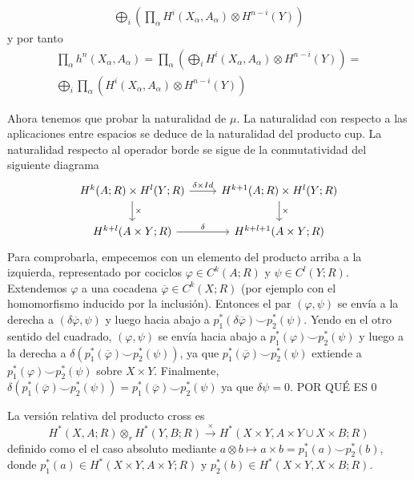 \documentclass[TA.tex]{subfiles}
\begin{document}
\begin{dem}
\begin{enumerate}
\begin{gather*}
\bigoplus_i\left( \prod_\alpha H^i(X_\alpha,A_\alpha)\otimes H^{n-i}(Y)\right)
\end{gather*}
y por tanto
\begin{gather*}
\prod_\alpha h^n(X_\alpha,A_\alpha)=\prod_\alpha\left(\bigoplus_i H^i(X_\alpha,A_\alpha)\otimes H^{n-i}(Y)\right)=\\
\bigoplus_i\prod_\alpha\left(H^i(X_\alpha,A_\alpha)\otimes H^{n-i}(Y)\right)
\end{gather*}
\end{enumerate}
Ahora tenemos que probar la naturalidad de $\mu$. La naturalidad con respecto a las aplicaciones entre espacios se deduce de la naturalidad del producto cup. La naturalidad respecto al operador borde se sigue de la conmutatividad del siguiente diagrama
\[
\begin{tikzcd}
H^k(A;R)\times H^l(Y;R) \arrow[r, "\delta\times Id"] \arrow[d, "\times"] & H^{k+1}(A;R)\times H^l(Y;R) \arrow[d, "\times"] \\
H^{k+l}(A\times Y;R) \arrow[r, "\delta"] & H^{k+l+1}(A\times Y;R)
\end{tikzcd}
\]
Para comprobarla, empecemos con un elemento del producto arriba a la izquierda, representado por cociclos $\varphi\in C^k(A;R)$ y $\psi\in C^l(Y;R)$. Extendemos $\varphi$ a una cocadena $\overline{\varphi}\in C^k(X;R)$ (por ejemplo con el homomorfismo inducido por la inclusión). Entonces el par $(\varphi,\psi)$ se envía a la derecha a $(\delta\overline{\varphi}, \psi)$ y luego hacia abajo a $p_1^*(\delta\overline{\varphi})\smile p_2^*(\psi)$. Yendo en el otro sentido del cuadrado, $(\varphi,\psi)$ se envía hacia abajo a $p_1^*(\varphi)\smile p_2^*(\psi)$ y luego a la derecha a $\delta(p_1^*(\overline{\varphi})\smile p_2^*(\psi))$, ya que $p_1^*(\overline{\varphi})\smile p_2^*(\psi)$ extiende a $p_1^*(\varphi)\smile p_2^*(\psi)$ sobre $X\times Y$. Finalmente, $\delta(p_1^*(\overline{\varphi})\smile p_2^*(\psi))=p_1^*(\overline{\varphi})\smile p_2^*(\psi)$ ya que $\delta\psi=0$. POR QUÉ ES 0
\end{dem}

La versión relativa del producto cross es
\[
H^*(X,A;R)\otimes_r H^*(Y,B;R)\xrightarrow{\times} H^*(X\times Y,A\times Y\cup X\times B;R)
\]
definido como el el caso absoluto mediante $a\otimes b\mapsto a\times b=p_1^*(a)\smile p_2^*(b)$, donde $p_1^*(a)\in H^*(X\times Y,A\times Y;R)$ y $p_2^*(b)\in H^*(X\times Y,X\times B;R)$. 
\end{document}
